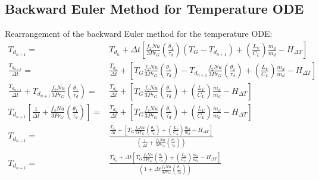 \documentclass[../Interim_Report_Master]{subfiles}
\begin{document}
\subsection{Backward Euler Method for Temperature ODE}\label{back_euler_temp_dev}
Rearrangement of the backward Euler method for the temperature ODE:
\begin{subequations}
\begin{align}
T_{d_{n+1}} =& T_{d_{n}} + \Delta t \left[\frac{f_{2}Nu}{3Pr_{G}}\left(\frac{\theta_1}{\tau_d}\right)(T_{G}-T_{d_{n+1}}) + \left(\frac{L_{V}}{C_{L}}\right)\frac{\dot{m}_{d}}{m_{d}} - H_{\Delta T}\right] \\
\frac{T_{d_{n+1}}}{\Delta t} =& \frac{T_{d_{n}}}{\Delta t} +  \left[T_{G}\frac{f_{2}Nu}{3Pr_{G}}\left(\frac{\theta_1}{\tau_d}\right) -T_{d_{n+1}}\frac{f_{2}Nu}{3Pr_{G}}\left(\frac{\theta_1}{\tau_d}\right) + \left(\frac{L_{V}}{C_{L}}\right)\frac{\dot{m}_{d}}{m_{d}} - H_{\Delta T}\right] \\
\frac{T_{d_{n+1}}}{\Delta t} + T_{d_{n+1}}\frac{f_{2}Nu}{3Pr_{G}}\left(\frac{\theta_1}{\tau_d}\right) =& \frac{T_{d_{n}}}{\Delta t} +  \left[T_{G}\frac{f_{2}Nu}{3Pr_{G}}\left(\frac{\theta_1}{\tau_d}\right) + \left(\frac{L_{V}}{C_{L}}\right)\frac{\dot{m}_{d}}{m_{d}} - H_{\Delta T}\right] \\
T_{d_{n+1}}\left[\frac{1}{\Delta t}+\frac{f_{2}Nu}{3Pr_{G}}\left(\frac{\theta_1}{\tau_d}\right)\right] =& \frac{T_{d_{n}}}{\Delta t} +  \left[T_{G}\frac{f_{2}Nu}{3Pr_{G}}\left(\frac{\theta_1}{\tau_d}\right) + \left(\frac{L_{V}}{C_{L}}\right)\frac{\dot{m}_{d}}{m_{d}} - H_{\Delta T}\right] \\
T_{d_{n+1}} =& \frac{\frac{T_{d_{n}}}{\Delta t} +  \left[T_{G}\frac{f_{2}Nu}{3Pr_{G}}\left(\frac{\theta_1}{\tau_d}\right) + \left(\frac{L_{V}}{C_{L}}\right)\frac{\dot{m}_{d}}{m_{d}} - H_{\Delta T}\right]}{\left(\frac{1}{\Delta t}+\frac{f_{2}Nu}{3Pr_{G}}\left(\frac{\theta_1}{\tau_d}\right)\right)} \\
T_{d_{n+1}} =& \frac{T_{d_{n}} + \Delta t \left[T_{G}\frac{f_{2}Nu}{3Pr_{G}}\left(\frac{\theta_1}{\tau_d}\right) + \left(\frac{L_{V}}{C_{L}}\right)\frac{\dot{m}_{d}}{m_{d}} - H_{\Delta T}\right]}{\left(1+\Delta t\frac{f_{2}Nu}{3Pr_{G}}\left(\frac{\theta_1}{\tau_d}\right)\right)}  
\end{align}
\end{subequations}
\end{document}
